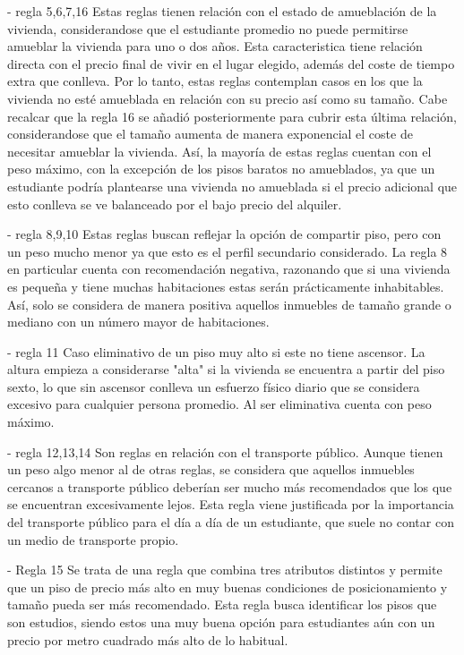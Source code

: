 \documentclass[12pt]{report} %
\begin{document}
    - regla 5,6,7,16
    Estas reglas tienen relación con el estado de amueblación de la vivienda, considerandose que el 
    estudiante promedio no puede permitirse amueblar la vivienda para uno o dos años. 
    Esta caracteristica tiene relación directa con el precio final de vivir en el lugar elegido, 
    además del coste de tiempo extra que conlleva. Por lo tanto, estas reglas contemplan casos en 
    los que la vivienda no esté amueblada en relación con su precio así como su tamaño. Cabe recalcar
    que la regla 16 se añadió posteriormente para cubrir esta última relación, considerandose que el 
    tamaño aumenta de manera exponencial el coste de necesitar amueblar la vivienda. Así, la mayoría 
    de estas reglas cuentan con el peso máximo, con la excepción de los pisos baratos no amueblados, ya que un
    estudiante podría plantearse una vivienda no amueblada si el precio adicional que esto conlleva 
    se ve balanceado por el bajo precio del alquiler.

    - regla 8,9,10
    Estas reglas buscan reflejar la opción de compartir piso, pero con un peso mucho menor ya que esto 
    es el perfil secundario considerado. La regla 8 en particular cuenta con recomendación negativa, 
    razonando que si una vivienda es pequeña y tiene muchas habitaciones estas serán prácticamente 
    inhabitables. Así, solo se considera de manera positiva aquellos inmuebles de tamaño grande o mediano
    con un número mayor de habitaciones.

    - regla 11
    Caso eliminativo de un piso muy alto si este no tiene ascensor. La altura empieza a 
    considerarse "alta" si la vivienda se encuentra a partir del piso sexto, lo que sin ascensor 
    conlleva un esfuerzo físico diario que se considera excesivo para cualquier persona promedio. 
    Al ser eliminativa cuenta con peso máximo.

    - regla 12,13,14
    Son reglas en relación con el transporte público. Aunque tienen un peso algo menor al de otras
    reglas, se considera que aquellos inmuebles cercanos a transporte público deberían ser mucho 
    más recomendados que los que se encuentran excesivamente lejos. Esta regla viene justificada
    por la importancia del transporte público para el día a día de un estudiante, que suele no contar 
    con un medio de transporte propio.

    - Regla 15
    Se trata de una regla que combina tres atributos distintos y permite que un piso de precio más 
    alto en muy buenas condiciones de posicionamiento y tamaño pueda ser más recomendado. Esta regla busca 
    identificar los pisos que son estudios, siendo estos una muy buena opción para estudiantes aún con 
    un precio por metro cuadrado más alto de lo habitual. 
\end{document}
